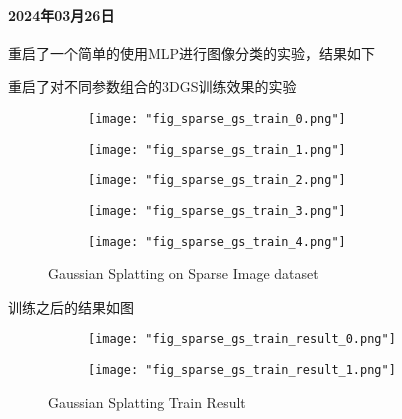 \paragraph{2024年03月26日}

重启了一个简单的使用MLP进行图像分类的实验，结果如下



重启了对不同参数组合的3DGS训练效果的实验



\begin{figure}
    \begin{subfigure}{0.18\linewidth}
        \texttt{[image: "fig\_sparse\_gs\_train\_0.png"]}
    \end{subfigure}
    \begin{subfigure}{0.18\linewidth}
        \texttt{[image: "fig\_sparse\_gs\_train\_1.png"]}
    \end{subfigure}
    \begin{subfigure}{0.18\linewidth}
        \texttt{[image: "fig\_sparse\_gs\_train\_2.png"]}
    \end{subfigure}
    \begin{subfigure}{0.18\linewidth}
        \texttt{[image: "fig\_sparse\_gs\_train\_3.png"]}
    \end{subfigure}
    \begin{subfigure}{0.18\linewidth}
        \texttt{[image: "fig\_sparse\_gs\_train\_4.png"]}
    \end{subfigure}
    \caption{Gaussian Splatting on Sparse Image dataset}
\end{figure}


训练之后的结果如图

\begin{figure}
    \begin{subfigure}{0.48\linewidth}
        \texttt{[image: "fig\_sparse\_gs\_train\_result\_0.png"]}
    \end{subfigure}
    \begin{subfigure}{0.48\linewidth}
        \texttt{[image: "fig\_sparse\_gs\_train\_result\_1.png"]}
    \end{subfigure}
    \caption{Gaussian Splatting Train Result}
\end{figure}


